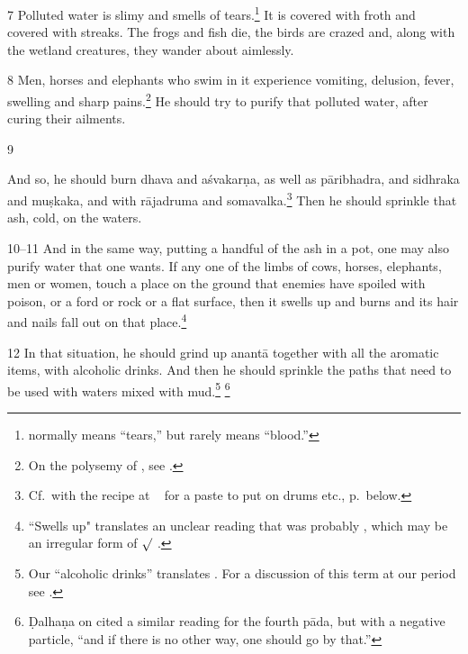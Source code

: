 \begin{translation}
\item
[7]  Polluted water is slimy and smells of  tears.\footnote{ normally 
means “tears,” but rarely means “blood.” }  It  is covered with froth and covered 
with streaks. The frogs and fish die,  the birds are crazed and, along with the 
wetland creatures, they wander about  aimlessly.  

\item [8]  Men, horses and elephants who swim in it  experience
vomiting, delusion, fever, swelling and sharp pains.\footnote{On  the
    polysemy of , see \cite{seme-1979}.} 
    He should try to purify that polluted water,  after curing their
    ailments.

\item [9]  
 
And so, he should burn \gls{dhava} and \gls{aśvakarṇa}, %
as well as \gls{pāribhadra}, %
and  \gls{sidhraka} and  \gls{muṣkaka}, %
and with \gls{rājadruma} %
and \gls{somavalka}.\footnote{\label{water-detox}Cf.\ with the
    recipe at \SS\  for a paste to put on drums etc., 
    p.\,\pageref{drum-detox} below.}
    Then he should sprinkle that ash, cold, on  the waters.

\item
 [10--11]  And in the same way, putting a handful of  the ash in a pot, one may 
 also purify water  that  one wants.  If any one of the limbs of cows, horses,  
 elephants, men or women, touch a place on the ground that enemies have 
 spoiled with  poison, or a ford or rock or a flat surface, then it swells up and 
 burns and its  hair and nails fall out on that place.\footnote{``Swells up" 
 translates an  unclear reading that was probably , which may be 
 an irregular  form of $\surd$  
 \citep[see][175--176]{whit-root}.}  

\item
 [12]  In that situation, he should grind up  \gls{anantā} together with all the  
 aromatic items, with alcoholic drinks.  And then he should sprinkle the paths 
 that need to be used with waters mixed with  mud.\footnote{Our “alcoholic 
 drinks”  translates .  For a discussion of this  term at our period see 
 \cite[37--39 \emph{et passim}]{mchu-2021}.}  \footnote{Ḍalhaṇa on   
 cited a similar  reading for the fourth pāda, but with a negative particle, “and if 
 there is no other way, one  should go by that.”}  


\end{translation}
